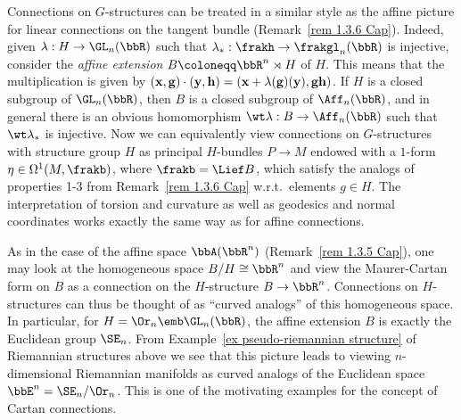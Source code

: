 \begin{example}\label{ex 1.3.6 Cap}
    Connections on $G$-structures can be treated in a similar style as the affine picture for linear connections on the tangent bundle (Remark~\ref{rem 1.3.6 Cap}). Indeed, given $\lambda:H\to \GL_n(\bbR)$ such that $\lambda_\ast:\frakh\to \frakgl_n(\bbR)$ is injective, consider the \emph{affine extension} $B\coloneqq \bbR^n\rtimes H$ of $H$. This means that the multiplication is given by $(\bf{x},g)\cdot (\bf{y},h)=(\bf{x}+\lambda(g)(\bf{y}),gh)$. If $H$ is a closed subgroup of $\GL_n(\bbR)$, then $B$ is a closed subgroup of $\Aff_n(\bbR)$, and in general there is an obvious homomorphism $\wt\lambda:B\to \Aff_n(\bbR)$ such that $\wt\lambda_{\ast}$  is injective. Now we can equivalently view connections on $G$-structures with structure group $H$ as principal $H$-bundles $P\to M$ endowed with a $1$-form $\eta\in\Omega^1(M,\frakb)$, where $\frakb=\Lief B$, which satisfy the analogs of properties 1-3 from Remark~\ref{rem 1.3.6 Cap} w.r.t.\ elements $g\in H$. The interpretation of torsion and curvature as well as geodesics and normal coordinates works exactly the same way as for affine connections.

    As in the case of the affine space $\bbA(\bbR^n)$ (Remark~\ref{rem 1.3.5 Cap}), one may look at the homogeneous space $B\slash H\cong\bbR^n$ and view the Maurer-Cartan form on $B$ as a connection on the $H$-structure $B\to\bbR^n$.  Connections on $H$-structures can thus be thought of as ``curved analogs'' of this homogeneous space. In particular, for $H=\Or_n\emb \GL_n(\bbR)$, the affine extension $B$ is exactly the Euclidean group $\SE_n$. From Example~\ref{ex pseudo-riemannian structure} of Riemannian structures above we see that this picture leads to viewing $n$-dimensional Riemannian manifolds as curved analogs of the Euclidean space $\bbE^n=\SE_n\slash\Or_n$. This is one of the motivating examples for the concept of Cartan connections.
\end{example}








